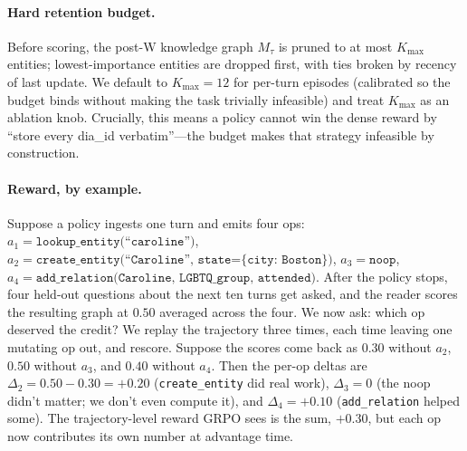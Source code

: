 \documentclass[11pt]{article}
\begin{document}
\paragraph{Hard retention budget.} Before scoring, the post-W
knowledge graph $M_\tau$ is pruned to at most $K_{\max}$ entities;
lowest-importance entities are dropped first, with ties broken by
recency of last update. We default to $K_{\max} = 12$ for per-turn
episodes (calibrated so the budget binds without making the task
trivially infeasible) and treat $K_{\max}$ as an ablation knob.
Crucially, this means a policy cannot win the dense reward by
``store every dia\_id verbatim''---the budget makes that strategy
infeasible by construction.

\paragraph{Reward, by example.} Suppose a policy ingests one turn and
emits four ops: $a_1 = \texttt{lookup\_entity(``caroline'')}$,
$a_2 = \texttt{create\_entity(``Caroline'', state=\{city: Boston\})}$,
$a_3 = \texttt{noop}$, $a_4 = \texttt{add\_relation(Caroline,
LGBTQ\_group, attended)}$. After the policy stops, four held-out
questions about the next ten turns get asked, and the reader scores
the resulting graph at $0.50$ averaged across the four. We now ask:
which op deserved the credit? We replay the trajectory three times,
each time leaving one mutating op out, and rescore. Suppose the
scores come back as $0.30$ without $a_2$, $0.50$ without $a_3$, and
$0.40$ without $a_4$. Then the per-op deltas are
$\Delta_2 = 0.50 - 0.30 = +0.20$ (\texttt{create\_entity} did real
work), $\Delta_3 = 0$ (the noop didn't matter; we don't even compute
it), and $\Delta_4 = +0.10$ (\texttt{add\_relation} helped some). The
trajectory-level reward GRPO sees is the sum, $+0.30$, but each op now
contributes its own number at advantage time.
\end{document}
